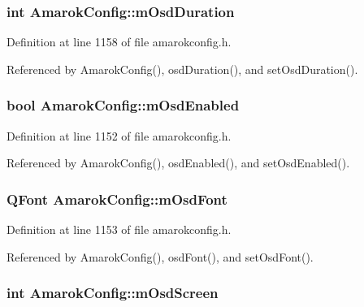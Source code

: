 \subsubsection{\setlength{\rightskip}{0pt plus 5cm}int {\bf Amarok\-Config::m\-Osd\-Duration}\hspace{0.3cm}{\tt  [protected]}}\label{classAmarokConfig_AmarokConfigp40}




Definition at line 1158 of file amarokconfig.h.

Referenced by Amarok\-Config(), osd\-Duration(), and set\-Osd\-Duration().
\subsubsection{\setlength{\rightskip}{0pt plus 5cm}bool {\bf Amarok\-Config::m\-Osd\-Enabled}\hspace{0.3cm}{\tt  [protected]}}\label{classAmarokConfig_AmarokConfigp34}




Definition at line 1152 of file amarokconfig.h.

Referenced by Amarok\-Config(), osd\-Enabled(), and set\-Osd\-Enabled().
\subsubsection{\setlength{\rightskip}{0pt plus 5cm}QFont {\bf Amarok\-Config::m\-Osd\-Font}\hspace{0.3cm}{\tt  [protected]}}\label{classAmarokConfig_AmarokConfigp35}




Definition at line 1153 of file amarokconfig.h.

Referenced by Amarok\-Config(), osd\-Font(), and set\-Osd\-Font().
\subsubsection{\setlength{\rightskip}{0pt plus 5cm}int {\bf Amarok\-Config::m\-Osd\-Screen}\hspace{0.3cm}{\tt  [protected]}}\label{classAmarokConfig_AmarokConfigp43}




